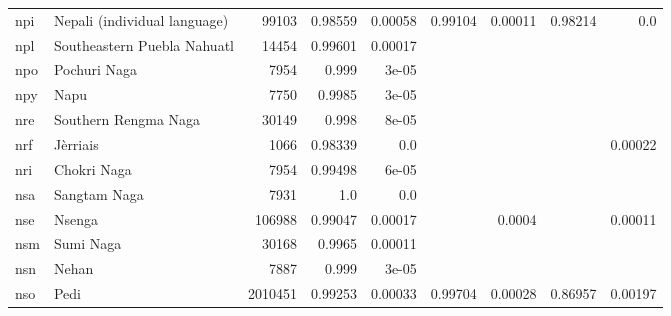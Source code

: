 \documentclass[11pt]{article}
\begin{document}
\begin{table*}[h]
{\begin{tabular}{llrrrrrrr}
npi         & Nepali (individual language)         & 99103         & 0.98559         & 0.00058         & 0.99104         & 0.00011         & 0.98214         & 0.0         \\

npl         & Southeastern Puebla Nahuatl         & 14454         & 0.99601         & 0.00017         &          &          &          &          \\

npo         & Pochuri Naga         & 7954         & 0.999         & 3e-05         &          &          &          &          \\

npy         & Napu         & 7750         & 0.9985         & 3e-05         &          &          &          &          \\

nre         & Southern Rengma Naga         & 30149         & 0.998         & 8e-05         &          &          &          &          \\

nrf         & Jèrriais         & 1066         & 0.98339         & 0.0         &          &          &          & 0.00022         \\

nri         & Chokri Naga         & 7954         & 0.99498         & 6e-05         &          &          &          &          \\

nsa         & Sangtam Naga         & 7931         & 1.0         & 0.0         &          &          &          &          \\

nse         & Nsenga         & 106988         & 0.99047         & 0.00017         &          & 0.0004         &          & 0.00011         \\

nsm         & Sumi Naga         & 30168         & 0.9965         & 0.00011         &          &          &          &          \\

nsn         & Nehan         & 7887         & 0.999         & 3e-05         &          &          &          &          \\

nso         & Pedi         & 2010451         & 0.99253         & 0.00033         & 0.99704         & 0.00028         & 0.86957         & 0.00197         \\


\end{tabular}}
\end{table*}
\end{document}
